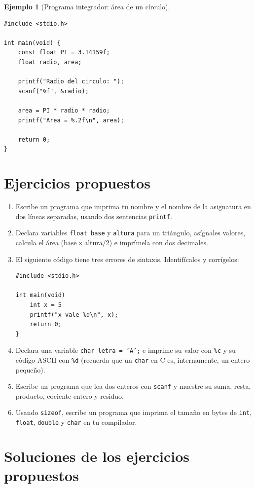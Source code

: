 \documentclass[11pt,letterpaper]{article}
\theoremstyle{definition}
\newtheorem{ejemplo}[definicion]{Ejemplo}
\begin{document}
\begin{ejemplo}[Programa integrador: área de un círculo]
\begin{lstlisting}
#include <stdio.h>

int main(void) {
    const float PI = 3.14159f;
    float radio, area;

    printf("Radio del circulo: ");
    scanf("%f", &radio);

    area = PI * radio * radio;
    printf("Area = %.2f\n", area);

    return 0;
}
\end{lstlisting}
\end{ejemplo}

\section{Ejercicios propuestos}

\begin{enumerate}[leftmargin=1.2cm]
  \item Escribe un programa que imprima tu nombre y el nombre de la asignatura en dos líneas
        separadas, usando dos sentencias \texttt{printf}.
  \item Declara variables \texttt{float base} y \texttt{altura} para un triángulo, asígnales
        valores, calcula el área ($\text{base}\times\text{altura}/2$) e imprímela con dos
        decimales.
  \item El siguiente código tiene tres errores de sintaxis. Identifícalos y corrígelos:
\begin{lstlisting}
#include <stdio.h>

int main(void)
    int x = 5
    printf("x vale %d\n", x);
    return 0;
}
\end{lstlisting}
  \item Declara una variable \texttt{char letra = 'A';} e imprime su valor con \texttt{\%c} y su
        código ASCII con \texttt{\%d} (recuerda que un \texttt{char} en C es, internamente, un
        entero pequeño).
  \item Escribe un programa que lea dos enteros con \texttt{scanf} y muestre su suma, resta,
        producto, cociente entero y residuo.
  \item Usando \texttt{sizeof}, escribe un programa que imprima el tamaño en bytes de \texttt{int},
        \texttt{float}, \texttt{double} y \texttt{char} en tu compilador.
\end{enumerate}

\section{Soluciones de los ejercicios propuestos}
\end{document}
